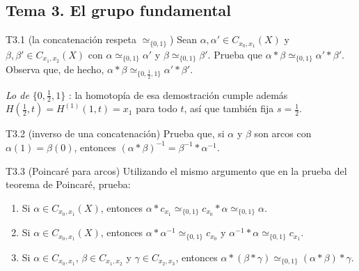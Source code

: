 \subsection{Tema 3. El grupo fundamental}

\begin{ejercicio}{T3.1 (la concatenación respeta $\simeq_{\{0,1\}}$)}
Sean $\alpha, \alpha' \in C_{x_0,x_1}(X)$ y $\beta, \beta' \in C_{x_1,x_2}(X)$ con $\alpha \simeq_{\{0,1\}} \alpha'$ y $\beta \simeq_{\{0,1\}} \beta'$. Prueba que $\alpha * \beta \simeq_{\{0,1\}} \alpha' * \beta'$. Observa que, de hecho, $\alpha * \beta \simeq_{\{0,\frac12,1\}} \alpha' * \beta'$.

 \quad {}

\emph{Lo de $\{0,\frac12,1\}$} \fuentepropia: la homotopía de esa demostración cumple además $H(\frac12,t) = H^{(1)}(1,t) = x_1$ para todo $t$, así que también fija $s = \frac12$.
\end{ejercicio}

\begin{ejercicio}{T3.2 (inverso de una concatenación)}
Prueba que, si $\alpha$ y $\beta$ son arcos con $\alpha(1) = \beta(0)$, entonces $(\alpha * \beta)^{-1} = \beta^{-1} * \alpha^{-1}$.

\end{ejercicio}

\begin{ejercicio}{T3.3 (Poincaré para arcos)}
Utilizando el mismo argumento que en la prueba del teorema de Poincaré, prueba:
\begin{enumerate}
    \item[a)] Si $\alpha \in C_{x_0,x_1}(X)$, entonces $\alpha * c_{x_1} \simeq_{\{0,1\}} c_{x_0} * \alpha \simeq_{\{0,1\}} \alpha$.
    \item[b)] Si $\alpha \in C_{x_0,x_1}(X)$, entonces $\alpha * \alpha^{-1} \simeq_{\{0,1\}} c_{x_0}$ y $\alpha^{-1} * \alpha \simeq_{\{0,1\}} c_{x_1}$.
    \item[c)] Si $\alpha \in C_{x_0,x_1}$, $\beta \in C_{x_1,x_2}$ y $\gamma \in C_{x_2,x_3}$, entonces $\alpha * (\beta * \gamma) \simeq_{\{0,1\}} (\alpha * \beta) * \gamma$.
\end{enumerate}

\end{ejercicio}

